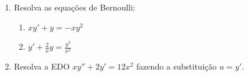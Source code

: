 \documentclass[a4paper,5pt]{amsbook}
\newcommand{\ds}{\displaystyle}
\begin{document}
\begin{enumerate}
    \vspace{0.5cm}
    \item Resolva as equa\c{c}\~oes de Bernoulli:
        \begin{enumerate}
            \vspace{0.3cm}
            \item $\ds xy'+y=-xy^2$
            \vspace{0.3cm}
            \item $\ds y'+\frac{2}{x}y=\frac{y^3}{x^2}$
            \vspace{0.3cm}
        \end{enumerate}

    \vspace{0.5cm}
    \item Resolva a EDO $xy''+2y'=12x^2$ fazendo a substitui\c{c}\~ao $u=y'$.
\end{enumerate}
\end{document}
